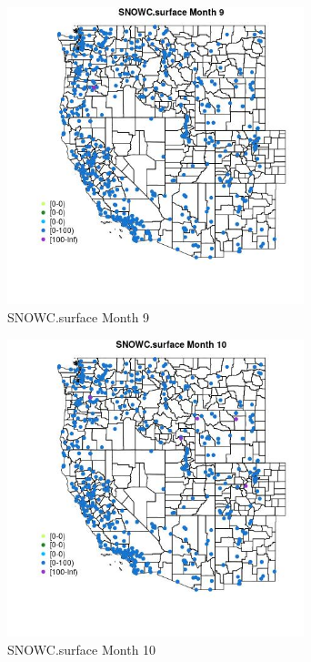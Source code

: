 \begin{figure} 
\centering  
\includegraphics[width=0.77\textwidth]{Code_Outputs/Report_ML_input_PM25_Step4_part_e_de_duplicated_aves_compiled_2019-05-14wNAs_MapObsMo9SNOWCsurface.jpg} 
\caption{\label{fig:Report_ML_input_PM25_Step4_part_e_de_duplicated_aves_compiled_2019-05-14wNAsMapObsMo9SNOWCsurface}SNOWC.surface Month 9} 
\end{figure} 
 

\begin{figure} 
\centering  
\includegraphics[width=0.77\textwidth]{Code_Outputs/Report_ML_input_PM25_Step4_part_e_de_duplicated_aves_compiled_2019-05-14wNAs_MapObsMo10SNOWCsurface.jpg} 
\caption{\label{fig:Report_ML_input_PM25_Step4_part_e_de_duplicated_aves_compiled_2019-05-14wNAsMapObsMo10SNOWCsurface}SNOWC.surface Month 10} 
\end{figure} 
 


